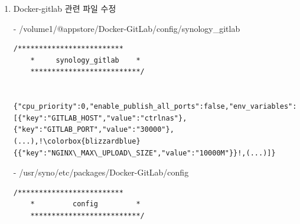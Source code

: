\documentclass[11pt
  , a4paper
  , article
  , oneside
]{memoir}
\begin{document}
\begin{itemize}
\begin{itemize}
\begin{enumerate}
{\begin{lstlisting}[style=termstyle, escapechar=!]
	/*************************
	*         php.ini        *
	**************************/
	
	[PHP]
	engine = On
	short_open_tag = On
	asp_tags = Off
	precision = 14
	output_buffering = 4096
	zlib.output_compression = Off
	implicit_flush = Off
	serialize_precision = 17
	disable_functions =
	disable_classes =
	zend.enable_gc = On
	expose_php = Off
	!\colorbox{blizzardblue}{max\_execution\_time = 24000}!     #default 240
	!\colorbox{blizzardblue}{max\_input\_time = 24000}!         #default60
	!\colorbox{blizzardblue}{memory\_limit = 12000M}!          #default128M
	error_reporting = E_ALL & ~E_NOTICE & ~E_STRICT & ~E_DEPRECATED
	display_startup_errors = Off
	log_errors = On
	log_errors_max_len = 1024
	ignore_repeated_errors = Off
	ignore_repeated_source = Off
	report_memleaks = On
	track_errors = Off
	html_errors = Off
	variables_order = "GPCS"
	request_order = "GP"
	register_argc_argv = Off
	auto_globals_jit = On
	!\colorbox{blizzardblue}{post\_max\_size = 24000M}!         #default32M
	default_mimetype = "text/html"
	default_charset = "UTF-8"
	include_path = "."
	extension_dir = "/usr/lib/php/modules"
	sys_temp_dir = "/var/services/tmp"
	enable_dl = Off
	file_uploads = On
	upload_tmp_dir = "/var/services/tmp"
	!\colorbox{blizzardblue}{upload\_max\_filesize = 12000M}!   #default32M
	max_file_uploads = 1000
	allow_url_fopen = On
	
	\end{lstlisting}
	}

	\item Docker-gitlab 관련 파일 수정
	\item[-] /volume1/@appstore/Docker-GitLab/config/synology\_gitlab
	{\scriptsize
	\begin{lstlisting}[style=termstyle, escapechar=!]
	/*************************
	*     synology_gitlab    *
	**************************/
	
	{"cpu_priority":0,"enable_publish_all_ports":false,"env_variables":[{"key":"GITLAB_HOST","value":"ctrlnas"},{"key":"GITLAB_PORT","value":"30000"},(...),!\colorbox{blizzardblue}{{"key":"NGINX\_MAX\_UPLOAD\_SIZE","value":"10000M"}}!,(...)]}
	\end{lstlisting}
	}
	
	
	\item[-] /usr/syno/etc/packages/Docker-GitLab/config 
	{\scriptsize
	\begin{lstlisting}[style=termstyle, escapechar=!]
	/*************************
	*         config         *
	**************************/
	

\end{lstlisting}}
\end{enumerate}
\end{itemize}
\end{itemize}
\end{document}
